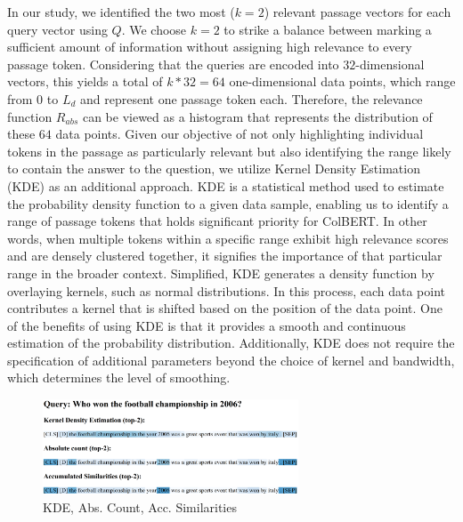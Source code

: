 \documentclass[11pt]{article}
\begin{document}
In our study, we identified the two most ($k=2$) relevant passage vectors for each query vector using $Q$.
We choose $k=2$ to strike a balance between marking a sufficient amount of information without assigning high relevance to every passage token. 
Considering that the queries are encoded into $32$-dimensional vectors, 
this yields a total of $k*32=64$ one-dimensional data points, which range from $0$ to $L_d$ and represent one passage token each.
Therefore, the relevance function $R_{abs}$ can be viewed as a histogram that represents the distribution of these $64$ data points. 
Given our objective of not only highlighting individual tokens in the passage as particularly relevant but also identifying the range likely to contain the answer to the question, we utilize Kernel Density Estimation (KDE)\cite{kde} as an additional approach. 
KDE is a statistical method used to estimate the probability density function to a given data sample, enabling us to identify a range of passage tokens that holds significant priority for ColBERT.
In other words, when multiple tokens within a specific range exhibit high relevance scores and are densely clustered together, it signifies the importance of that particular range in the broader context.
Simplified, KDE generates a density function by overlaying kernels, such as normal distributions.
In this process, each data point contributes a kernel that is shifted based on the position of the data point.
One of the benefits of using KDE is that it provides a smooth and continuous estimation of the probability distribution. 
Additionally, KDE does not require the specification of additional parameters beyond the choice of kernel and bandwidth, 
which determines the level of smoothing.

\begin{figure}[h]
	\includegraphics[width = 7.6cm, left]{"./images/heatmap1.png"}
	\caption{KDE, Abs. Count, Acc. Similarities}
	\label{fig:example1}
\end{figure}
\end{document}
